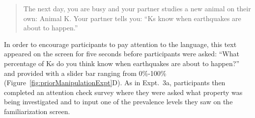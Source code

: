 \documentclass[floatsintext,man]{apa6}
\begin{document}
\begin{quote}
The next day, you are busy and your partner studies a new animal on their own: Animal K.
Your partner tells you: \enquote{Ks know when earthquakes are about to happen.}
\end{quote}

In order to encourage participants to pay attention to the language, this text appeared on the screen for five seconds before participants were asked: \enquote{What percentage of Ks do you think know when earthquakes are about to happen?} and provided with a slider bar ranging from 0\%-100\% (Figure~\ref{fig:priorManipulationExpt}D).
As in Expt.~3a, participants then completed an attention check survey where they were asked what property was being investigated and to input one of the prevalence levels they saw on the familiarization screen.

\end{document}
